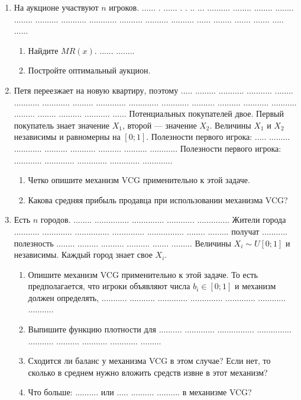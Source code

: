 \documentclass[11pt, openany]{book}
\numberwithin{equation}{page} %
\theoremstyle{definition} %
\theoremstyle{definition}
\theoremstyle{definition}
\begin{document}
\begin{enumerate}

\item На аукционе участвуют $n$ игроков. ...... . ...... . . .. ... .......... ........ ........ ........ ........ .......... ........... ............ .......... .......... .......... ...... ........ ....... ....... ..... ......
\begin{enumerate}
\item Найдите $ MR(x) $. ...... ........
\item Постройте оптимальный аукцион.
\end{enumerate}

\item Петя переезжает на новую квартиру, поэтому ..... ......... ........... ........... ........ ........... ............ ......... ............. ............. ............ .......... .......... ........... ........... ......... ........ .......... ........... ...... Потенциальных покупателей двое. Первый покупатель знает значение $ X_{1} $, второй — значение $ X_{2} $. Величины  $ X_{1} $ и  $ X_{2} $ независимы и равномерны на $ [0;1] $. Полезности первого игрока: ..... ......... ............ .......... ........... .......... .......... ............ Полезности первого игрока: ............ ............. ............. ............. .............
\begin{enumerate}
\item Четко опишите механизм VCG применительно к этой задаче.
\item Какова средняя прибыль продавца при использовании механизма VCG?
\end{enumerate}


\item Есть $ n $ городов. ........ ............... .............. ............ .............. Жители города ........... ............. ............... .............. ................ ........ ......... получат ........... полезность ........ ......... .......... .......... ....... .........  Величины $ X_{i}\sim U[0;1] $ и независимы. Каждый город знает свое $ X_{i} $.
\begin{enumerate}
\item Опишите механизм VCG применительно к этой задаче. То есть предполагается, что игроки объявляют числа $ b_{i}\in [0;1] $ и механизм должен определять, ........... ........... ............. .............. ............. ............ ...........
\item Выпишите функцию плотности для .......... ............. ................ ............... ........... .......... ........... ............ .........
\item Сходится ли баланс у механизма VCG в этом случае? Если нет, то сколько в среднем нужно вложить средств извне в этот механизм?
\item Что больше: .......... или ..... .......... .......... в механизме VCG?
\end{enumerate}



\end{enumerate}
\end{document}
